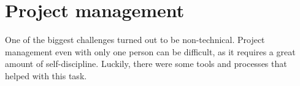 \section{Project management}\label{project-management}

One of the biggest challenges turned out to be non-technical.
Project management even with only one person can be difficult,
as it requires a great amount of self-discipline.
Luckily, there were some tools and processes that helped with this task.



